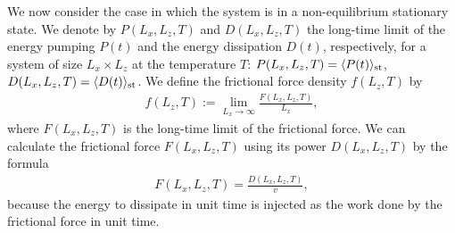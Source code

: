 We now consider the case in which the system is in a non-equilibrium stationary state. We denote by $P(L_{x}, L_{z}, T)$ and $D(L_{x}, L_{z}, T)$ the long-time limit of the energy pumping $P(t)$ and the energy dissipation $D(t)$, respectively, for a system of size $L_{x}\times L_{z}$ at the temperature $T$: $P(L_{x},L_{z},T)=\langle P(t)\rangle_{\rm st}$, $D(L_{x},L_{z},T)=\langle D(t)\rangle_{\rm st}$. We define the frictional force density $f(L_{z}, T)$ by
\begin{align}
f(L_{z}, T):=\lim_{L_{x}\to\infty}\frac{F(L_{x}, L_{z}, T)}{L_{x}},
\end{align}
where $F(L_{x}, L_{z}, T)$ is the long-time limit of the frictional force. We can calculate the frictional force $F(L_{x}, L_{z}, T)$ using its power $D(L_{x}, L_{z}, T)$ by the formula
\begin{align}
F(L_{x}, L_{z}, T)=\frac{D(L_{x}, L_{z}, T)}{v}\label{for:frictionalforce},
\end{align}
because the energy to dissipate in unit time is injected as the work done by the frictional force in unit time.

